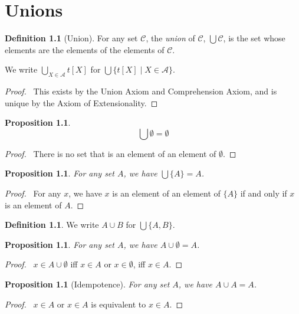 \documentclass{report}
\let\qed\relax
\newtheorem{prop}[ax]{Proposition}
\theoremstyle{definition}
\newtheorem{df}[ax]{Definition}
\begin{document}
\chapter{Unions}

\begin{df}[Union]
For any set $\mathcal{C}$, the \emph{union} of $\mathcal{C}$, $\bigcup \mathcal{C}$, is the set whose elements are the elements of the elements of $\mathcal{C}$.

We write $\bigcup_{X \in \mathcal{A}} t[X]$ for $\bigcup \{t[X] \mid X \in \mathcal{A} \}$.
\end{df}

\begin{proof}
\pf\ This exists by the Union Axiom and Comprehension Axiom, and is unique by the Axiom of Extensionality. \qed
\end{proof}

\begin{prop}
\[ \bigcup \emptyset = \emptyset \]
\end{prop}

\begin{proof}
\pf\ There is no set that is an element of an element of $\emptyset$. \qed
\end{proof}

\begin{prop}
For any set $A$, we have $\bigcup \{A\} = A$.
\end{prop}

\begin{proof}
\pf\ For any $x$, we have $x$ is an element of an element of $\{A\}$ if and only if $x$ is an element of $A$. \qed
\end{proof}

\begin{df}
We write $A \cup B$ for $\bigcup \{A,B\}$.
\end{df}

\begin{prop}
For any set $A$, we have $A \cup \emptyset = A$.
\end{prop}

\begin{proof}
\pf\ $x \in A \cup \emptyset$ iff $x \in A$ or $x \in \emptyset$, iff $x \in A$. \qed
\end{proof}

\begin{prop}[Idempotence]
For any set $A$, we have $A \cup A = A$.
\end{prop}

\begin{proof}
\pf\ $x \in A$ or $x \in A$ is equivalent to $x \in A$. \qed
\end{proof}
\end{document}
